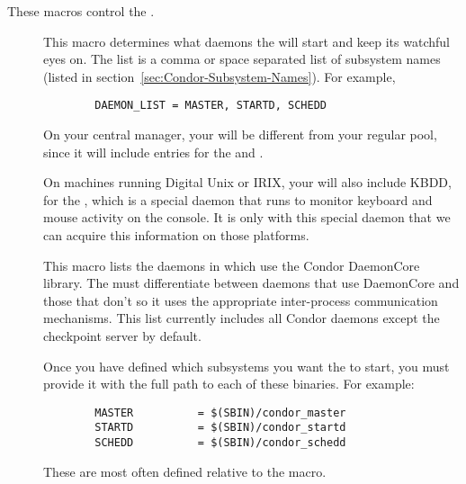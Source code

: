 These macros control the .
\begin{description}
  
\item[] \label{param:DaemonList} This macro
  determines what daemons the  will start and keep its
  watchful eyes on.  The list is a comma or space separated list of
  subsystem names (listed in
  section~\ref{sec:Condor-Subsystem-Names}).  For example,
\begin{verbatim}
        DAEMON_LIST = MASTER, STARTD, SCHEDD
\end{verbatim}

  \Note On your central manager, your 
  will be different from your regular pool, since it will include
  entries for the  and .  
  
  \Note On machines running Digital Unix or IRIX, your
   will also include KBDD, for the
  , which is a special daemon that runs to monitor
  keyboard and mouse activity on the console.  It is only with this
  special daemon that we can acquire this information on those
  platforms. 

\item[] \label{param:DCDaemonList} This macro
  lists the daemons in  which use the Condor
  DaemonCore library.  The  must differentiate between
  daemons that use DaemonCore and those that don't so it uses the
  appropriate inter-process communication mechanisms.  This list
  currently includes all Condor daemons except the checkpoint server
  by default.

\item[] \label{param:SUBSYS} Once you have defined which
  subsystems you want the  to start, you must provide
  it with the full path to each of these binaries.  For example:
\begin{verbatim}
        MASTER          = $(SBIN)/condor_master
        STARTD          = $(SBIN)/condor_startd
        SCHEDD          = $(SBIN)/condor_schedd
\end{verbatim}
  These are most often defined relative to the  macro.


\end{description}
